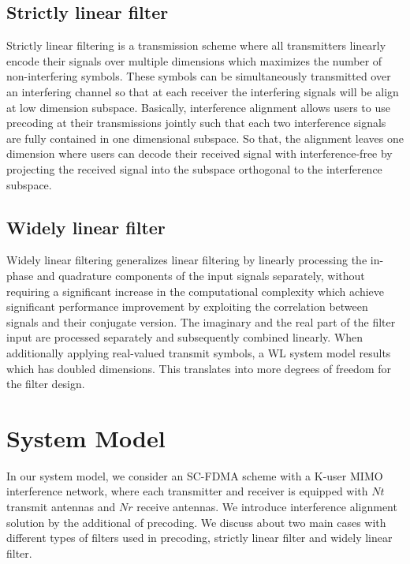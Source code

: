 \documentclass[12pt,a4paper,notitlepage,twoside,headsepline]{scrartcl}
\begin{document}
\subsection{Strictly linear filter}

Strictly linear filtering is a transmission scheme where all transmitters linearly encode their signals over multiple dimensions which maximizes the number of non-interfering symbols. These symbols can be simultaneously transmitted over an interfering channel so that at each receiver the interfering signals will be align at low dimension subspace. Basically, interference alignment allows users to use precoding at their transmissions jointly such that each two interference signals are fully contained in one dimensional subspace. So that, the alignment leaves one dimension where users can decode their received signal with interference-free by projecting the received signal into the subspace orthogonal to the interference subspace.


\subsection{Widely linear filter}

Widely linear filtering generalizes linear filtering by linearly processing the in-phase and quadrature components of the input signals separately, without requiring a significant increase in the computational complexity which achieve significant performance improvement by exploiting the correlation between signals and their conjugate version. The imaginary and the real part of the filter input are processed separately and subsequently combined linearly. When additionally applying real-valued transmit symbols, a WL system model results which has doubled dimensions. This translates into more degrees of freedom for the filter design.

\section{System Model}

In our system model, we consider an SC-FDMA scheme with a K-user MIMO interference network, where each transmitter and receiver is equipped with $Nt$ transmit antennas and $Nr$ receive antennas. We introduce interference alignment solution by the additional of precoding. We discuss about two main cases with different types of filters used in precoding, strictly linear filter and widely linear filter. 
\end{document}
